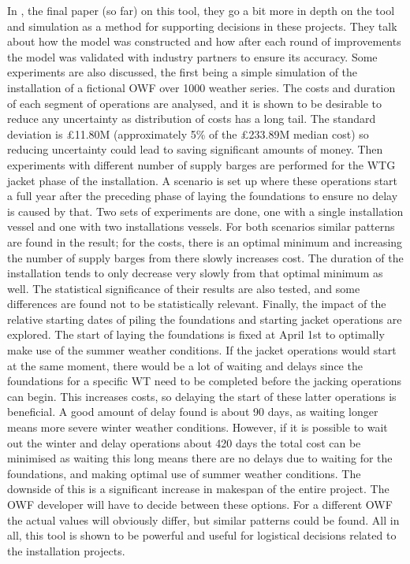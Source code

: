 \documentclass[a4paper,12pt]{article}
\begin{document}
In \cite{barlow2017using}, the final paper (so far) on this tool, they go a bit more in depth on the tool and simulation as a method for supporting decisions in these projects. They talk about how the model was constructed and how after each round of improvements the model was validated with industry partners to ensure its accuracy. Some experiments are also discussed, the first being a simple simulation of the installation of a fictional OWF over 1000 weather series. The costs and duration of each segment of operations are analysed, and it is shown to be desirable to reduce any uncertainty as distribution of costs has a long tail. The standard deviation is \pounds 11.80M (approximately 5\% of the \pounds 233.89M median cost) so reducing uncertainty could lead to saving significant amounts of money. Then experiments with different number of supply barges are performed for the WTG jacket phase of the installation. A scenario is set up where these operations start a full year after the preceding phase of laying the foundations to ensure no delay is caused by that. Two sets of experiments are done, one with a single installation vessel and one with two installations vessels. For both scenarios similar patterns are found in the result; for the costs, there is an optimal minimum and increasing the number of supply barges from there slowly increases cost. The duration of the installation tends to only decrease very slowly from that optimal minimum as well. The statistical significance of their results are also tested, and some differences are found not to be statistically relevant. Finally, the impact of the relative starting dates of piling the foundations and starting jacket operations are explored. The start of laying the foundations is fixed at April 1st to optimally make use of the summer weather conditions. If the jacket operations would start at the same moment, there would be a lot of waiting and delays since the foundations for a specific WT need to be completed before the jacking operations can begin. This increases costs, so delaying the start of these latter operations is beneficial. A good amount of delay found is about 90 days, as waiting longer means more severe winter weather conditions. However, if it is possible to wait out the winter and delay operations about 420 days the total cost can be minimised as waiting this long means there are no delays due to waiting for the foundations, and making optimal use of summer weather conditions. The downside of this is a significant increase in makespan of the entire project. The OWF developer will have to decide between these options. For a different OWF the actual values will obviously differ, but similar patterns could be found. All in all, this tool is shown to be powerful and useful for logistical decisions related to the installation projects. 
\end{document}
